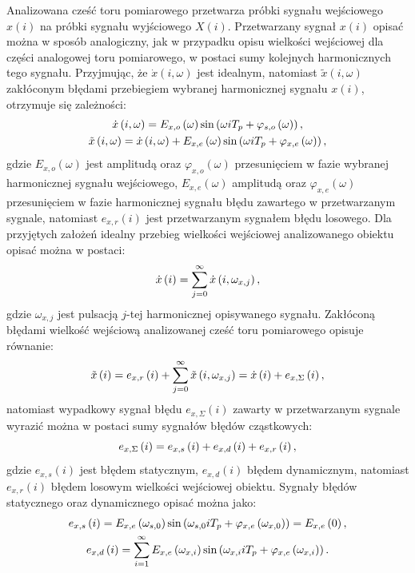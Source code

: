 Analizowana cześć toru pomiarowego przetwarza próbki sygnału wejściowego $x(i)$ na próbki sygnału wyjściowego $X(i)$. Przetwarzany sygnał $x(i)$ opisać można w sposób analogiczny, jak w przypadku opisu wielkości wejściowej dla części analogowej toru pomiarowego, w postaci sumy kolejnych harmonicznych tego sygnału. Przyjmując, że $\dot{x}(i, \omega)$ jest idealnym, natomiast $\tilde{x}(i, \omega)$ zakłóconym błędami przebiegiem wybranej harmonicznej sygnału $x(i)$, otrzymuje się zależności:
\begin{gather}
\dot{x} \left( i, \omega \right) = E_{x,o} \left(\omega\right) \sin \left( \omega iT_{p} + \varphi_{s,o} \left(\omega\right) \right) \label{eq:in_disc_omega_ideal}, \\
\tilde{x} \left( i, \omega \right) = \dot{x} \left( i, \omega \right) + E_{x,e} \left(\omega\right) \sin \left( \omega iT_{p} + \varphi_{x,e} \left(\omega\right) \right) \label{eq:in_disc_omega_real},
\end{gather}
gdzie $E_{x,o}(\omega)$ jest amplitudą oraz $\varphi_{x,o}(\omega)$ przesunięciem w fazie wybranej harmonicznej sygnału wejściowego, $E_{x,e}(\omega)$ amplitudą oraz $\varphi_{x,e}(\omega)$ przesunięciem w fazie harmonicznej sygnału błędu zawartego w przetwarzanym sygnale, natomiast $e_{x,r}(i)$ jest przetwarzanym sygnałem błędu losowego. Dla przyjętych założeń idealny przebieg wielkości wejściowej analizowanego obiektu opisać można w postaci:
\begin{equation}
\dot{x} \left(i\right) = \sum _{j = 0} ^{\infty} \dot{x} \left( i, \omega_{x,j} \right) \label{eq:in_disc_sum}, 
\end{equation}
gdzie $\omega_{x,j}$ jest pulsacją $j$-tej harmonicznej opisywanego sygnału. Zakłóconą błędami wielkość wejściową analizowanej cześć toru pomiarowego opisuje równanie:
\begin{equation}
\tilde{x} \left(i\right) = e_{x,r} \left(i\right) + \sum _{j = 0} ^{\infty} \tilde{x} \left( i, \omega_{x,j} \right) = \dot{x} \left(i\right) + e_{x,\Sigma} \left(i\right) \label{eq:in_disc_real},
\end{equation}
natomiast wypadkowy sygnał błędu $e_{x,\Sigma}(i)$ zawarty w przetwarzanym sygnale wyrazić można w postaci sumy sygnałów błędów cząstkowych:
\begin{equation}
e_{x,\Sigma} \left(i\right) = e_{x,s} \left(i\right) + e_{x,d} \left(i\right) + e_{x,r} \left(i\right) \label{eq:in_disc_err_sum},
\end{equation}
gdzie $e_{x,s}(i)$ jest błędem statycznym, $e_{x,d}(i)$ błędem dynamicznym, natomiast $e_{x,r}(i)$ błędem losowym wielkości wejściowej obiektu. Sygnały błędów statycznego oraz dynamicznego opisać można jako:
\begin{gather}
e_{x,s} \left(i\right) = E_{x,e} \left(\omega_{s,0}\right) \sin \left( \omega_{s,0} iT_{p} + \varphi_{x,e} \left(\omega_{x,0}\right) \right) = E_{x,e} \left(0\right) \label{eq:in_disc_err_stat}, \\
e_{x,d} \left(i\right) = \sum _{i = 1} ^{\infty} E_{x,e} \left(\omega_{x,i}\right) \sin \left( \omega_{x,i} iT_{p} + \varphi_{x,e} \left(\omega_{x,i}\right) \right) \label{eq:in_disc_err_dyn}.
\end{gather}

